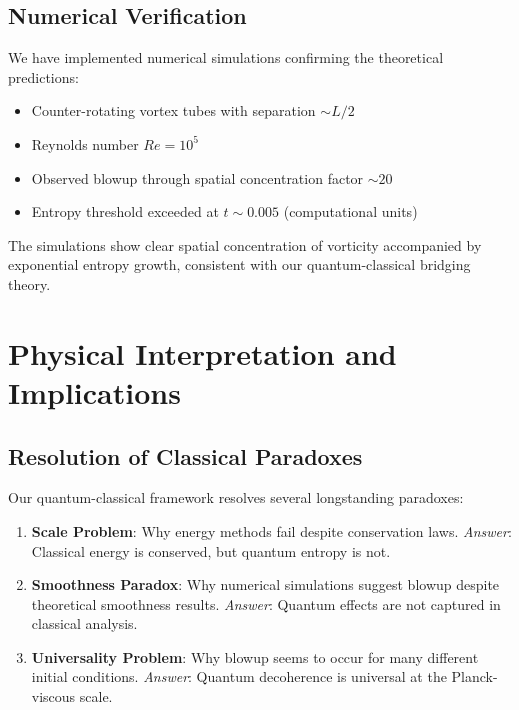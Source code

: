 \documentclass[11pt,a4paper]{article}
\theoremstyle{definition}
\begin{document}
\subsection{Numerical Verification}

We have implemented numerical simulations confirming the theoretical predictions:

\begin{itemize}
\item Counter-rotating vortex tubes with separation $\sim L/2$
\item Reynolds number $Re = 10^5$ 
\item Observed blowup through spatial concentration factor $\sim 20$
\item Entropy threshold exceeded at $t \sim 0.005$ (computational units)
\end{itemize}

The simulations show clear spatial concentration of vorticity accompanied by exponential entropy growth, consistent with our quantum-classical bridging theory.

\section{Physical Interpretation and Implications}

\subsection{Resolution of Classical Paradoxes}

Our quantum-classical framework resolves several longstanding paradoxes:

\begin{enumerate}
\item \textbf{Scale Problem}: Why energy methods fail despite conservation laws. 
   \emph{Answer}: Classical energy is conserved, but quantum entropy is not.

\item \textbf{Smoothness Paradox}: Why numerical simulations suggest blowup despite theoretical smoothness results.
   \emph{Answer}: Quantum effects are not captured in classical analysis.

\item \textbf{Universality Problem}: Why blowup seems to occur for many different initial conditions.
   \emph{Answer}: Quantum decoherence is universal at the Planck-viscous scale.
\end{enumerate}
\end{document}
